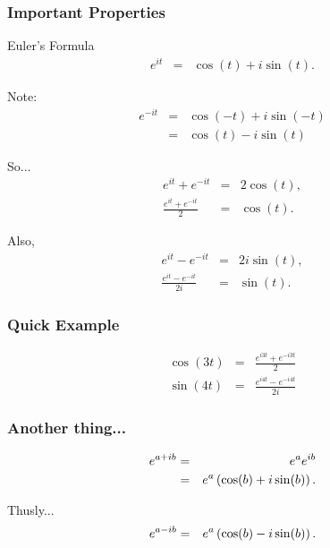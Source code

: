 {\begin{frame}
{     }\fi

    \vfill
    \vfill
    \vfill

\end{frame}

}


\begin{frame}
  \frametitle{Important Properties}

  Euler's Formula
  \begin{eqnarray*}
    e^{it} & = & \cos(t) + i\sin(t). 
  \end{eqnarray*}

  Note:
  \begin{eqnarray*}
    e^{-it} & = & \cos(-t) + i\sin(-t) \\
    & = & \cos(t) - i\sin(t)
  \end{eqnarray*}

  So...
  \begin{eqnarray*}
    e^{it} + e^{-it} & = & 2 \cos(t), \\
    \frac{e^{it} + e^{-it}}{2} & = & \cos(t).
  \end{eqnarray*}

  Also,
  \begin{eqnarray*}
    e^{it} - e^{-it} & = & 2 i \sin(t), \\
    \frac{e^{it} - e^{-it}}{2i} & = & \sin(t).
  \end{eqnarray*}



\end{frame}


\begin{frame}
  \frametitle{Quick Example}

  \begin{eqnarray*}
    \cos(3t) & = & \frac{e^{i3t}+e^{-i3t}}{2} \\
    \sin(4t) & = & \frac{e^{i4t}-e^{-i4t}}{2i}
  \end{eqnarray*}

\end{frame}


\begin{frame}
  \frametitle{Another thing...}

  \begin{eqnarray*}
    e^{a+ib} & = & e^a e^{ib} \\
    & = & e^a \left( \cos(b) + i \sin(b) \right).
  \end{eqnarray*}

  Thusly...
  \begin{eqnarray*}
    e^{a-ib} & = & e^a \left( \cos(b) - i \sin(b) \right).
  \end{eqnarray*}

\end{frame}


